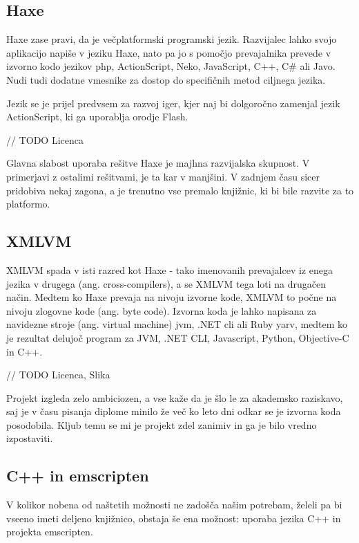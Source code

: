 \subsection{Haxe}

Haxe\cite{haxe} zase pravi, da je večplatformski programski jezik. Razvijalec lahko svojo aplikacijo napiše v jeziku Haxe, nato pa jo s pomočjo prevajalnika prevede v izvorno kodo jezikov \gls{php}, ActionScript, Neko, JavaScript, C++, C\# ali Javo. Nudi tudi dodatne vmesnike za dostop do specifičnih metod ciljnega jezika.

Jezik se je prijel predvsem za razvoj iger, kjer naj bi dolgoročno zamenjal jezik ActionScript, ki ga uporablja orodje Flash.

// TODO Licenca

Glavna slabost uporaba rešitve Haxe je majhna razvijalska skupnost. V primerjavi z ostalimi rešitvami, je ta kar v manjšini. V zadnjem času sicer pridobiva nekaj zagona, a je trenutno vse premalo knjižnic, ki bi bile razvite za to platformo.

\subsection{XMLVM}

XMLVM\cite{xmlvm} spada v isti razred kot Haxe - tako imenovanih prevajalcev iz enega jezika v drugega (ang. cross-compilers), a se XMLVM tega loti na drugačen način. Medtem ko Haxe prevaja na nivoju izvorne kode, XMLVM to počne na nivoju zlogovne kode (ang. byte code). Izvorna koda je lahko napisana za navidezne stroje (ang. virtual machine) \gls{jvm}, .NET \gls{cli} ali Ruby \gls{yarv}, medtem ko je rezultat delujoč program za JVM, .NET CLI, Javascript, Python, Objective-C in C++.

// TODO Licenca, Slika

Projekt izgleda zelo ambiciozen, a vse kaže da je šlo le za akademsko raziskavo, saj je v času pisanja diplome minilo že več ko leto dni odkar se je izvorna koda posodobila. Kljub temu se mi je projekt zdel zanimiv in ga je bilo vredno izpostaviti.

\subsection{C++ in emscripten}

V kolikor nobena od naštetih možnosti ne zadošča našim potrebam, želeli pa bi vseeno imeti deljeno knjižnico, obstaja še ena možnost: uporaba jezika C++\cite{cpp} in projekta emscripten\cite{emscripten}.

